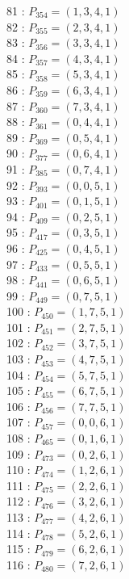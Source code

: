 \documentclass{article}
\begin{document}
{\begin{multicols}{3}
81 : $P_{354}=( 1, 3, 4, 1 )$\\
82 : $P_{355}=( 2, 3, 4, 1 )$\\
83 : $P_{356}=( 3, 3, 4, 1 )$\\
84 : $P_{357}=( 4, 3, 4, 1 )$\\
85 : $P_{358}=( 5, 3, 4, 1 )$\\
86 : $P_{359}=( 6, 3, 4, 1 )$\\
87 : $P_{360}=( 7, 3, 4, 1 )$\\
88 : $P_{361}=( 0, 4, 4, 1 )$\\
89 : $P_{369}=( 0, 5, 4, 1 )$\\
90 : $P_{377}=( 0, 6, 4, 1 )$\\
91 : $P_{385}=( 0, 7, 4, 1 )$\\
92 : $P_{393}=( 0, 0, 5, 1 )$\\
93 : $P_{401}=( 0, 1, 5, 1 )$\\
94 : $P_{409}=( 0, 2, 5, 1 )$\\
95 : $P_{417}=( 0, 3, 5, 1 )$\\
96 : $P_{425}=( 0, 4, 5, 1 )$\\
97 : $P_{433}=( 0, 5, 5, 1 )$\\
98 : $P_{441}=( 0, 6, 5, 1 )$\\
99 : $P_{449}=( 0, 7, 5, 1 )$\\
100 : $P_{450}=( 1, 7, 5, 1 )$\\
101 : $P_{451}=( 2, 7, 5, 1 )$\\
102 : $P_{452}=( 3, 7, 5, 1 )$\\
103 : $P_{453}=( 4, 7, 5, 1 )$\\
104 : $P_{454}=( 5, 7, 5, 1 )$\\
105 : $P_{455}=( 6, 7, 5, 1 )$\\
106 : $P_{456}=( 7, 7, 5, 1 )$\\
107 : $P_{457}=( 0, 0, 6, 1 )$\\
108 : $P_{465}=( 0, 1, 6, 1 )$\\
109 : $P_{473}=( 0, 2, 6, 1 )$\\
110 : $P_{474}=( 1, 2, 6, 1 )$\\
111 : $P_{475}=( 2, 2, 6, 1 )$\\
112 : $P_{476}=( 3, 2, 6, 1 )$\\
113 : $P_{477}=( 4, 2, 6, 1 )$\\
114 : $P_{478}=( 5, 2, 6, 1 )$\\
115 : $P_{479}=( 6, 2, 6, 1 )$\\
116 : $P_{480}=( 7, 2, 6, 1 )$\\

\end{multicols}}
\end{document}
